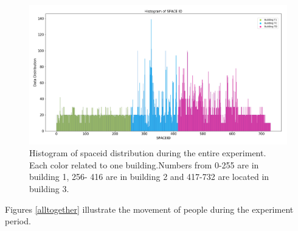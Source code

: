 \begin{figure}
    \centering
    \includegraphics[width = 16 cm]{image/Chapters/Chapter6/uniqspaceid.png}
    \caption{Histogram of spaceid distribution during the entire experiment. Each color related to one building.Numbers from 0-255 are in building 1, 256- 416 are in building 2 and 417-732 are located in building 3.}
    \label{spaceiduniq }
\end{figure}






Figures \ref{alltogether} illustrate the movement of people during the experiment period. 







